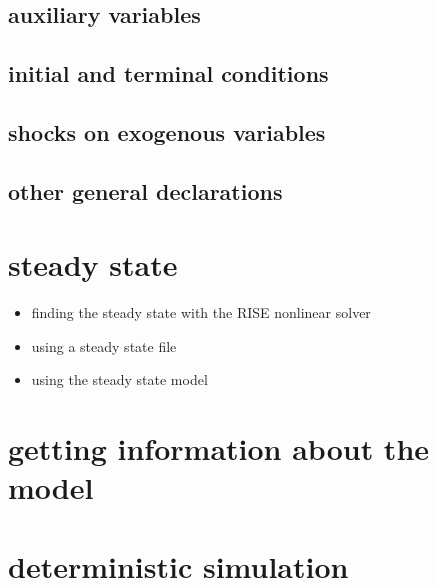 \documentclass[letterpaper,10pt,english]{sphinxmanual}
\begin{document}
\subsection{auxiliary variables}
\label{dsge_interface:auxiliary-variables}

\subsection{initial and terminal conditions}
\label{dsge_interface:initial-and-terminal-conditions}

\subsection{shocks on exogenous variables}
\label{dsge_interface:shocks-on-exogenous-variables}

\subsection{other general declarations}
\label{dsge_interface:other-general-declarations}

\section{steady state}
\label{dsge_interface:steady-state}\begin{itemize}
\item {} 
finding the steady state with the RISE nonlinear solver

\item {} 
using a steady state file

\item {} 
using the steady state model

\end{itemize}


\section{getting information about the model}
\label{dsge_interface:getting-information-about-the-model}

\section{deterministic simulation}
\label{dsge_interface:deterministic-simulation}
\end{document}
